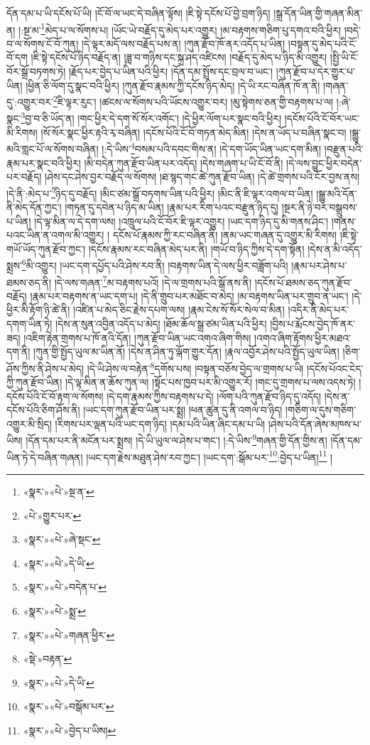 དོན་དམ་པ་ཡི་དངོས་པོ་ཡི། །ངོ་བོ་ལ་ཡང་དེ་བཞིན་ལྟོས། །ཇི་སྟེ་དངོས་པོ་བྱེ་བྲག་ཉིད། །སྒྲ་དོན་ཡིན་གྱི་གཞན་མིན་ན། །:སྔ་མ་\footnote{«སྣར་»«པེ་»སྔ་ན་}མེད་པ་ལ་སོགས་པ། །ཡོང་ཡེ་བརྗོད་དུ་མེད་པར་འགྱུར། །མ་བརྟགས་གཅིག་པུ་དགའ་བའི་ཕྱིར། །བདེ་བ་ལ་སོགས་ངོ་བོ་ཀུན། །དེ་ལྟར་མདོ་ལས་བརྗོད་པས་ན། །ཀུན་རྫོབ་ཁོ་ནར་འདོད་པ་ཡིན། །བསྟན་དུ་མེད་པའི་ངོ་བོ་དག །ཇི་སྟེ་དངོས་པོ་ཉིད་བརྗོད་ན། །ཟླ་བ་གཉིས་དང་སྐྲ་ཤད་འཛིངས། །བརྗོད་དུ་མེད་པ་ཉིད་མི་འགྱུར། །སྤྱི་ཡི་ངོ་བོར་སྒྲོ་བཏགས་ཏེ། །རྗོད་པར་བྱེད་པ་ཡིན་པའི་ཕྱིར། །དོན་དམ་སྤྲོས་དང་བྲལ་བ་ཡང་། །ཀུན་རྫོབ་པ་དེར་གྱུར་པ་ཡིན། །ཕྱིན་ཅི་ལོག་དུ་སྣང་བའི་ཕྱིར། །ཀུན་རྫོབ་རྣམས་ཀྱི་དངོས་ཉིད་མེད། །དེ་ཡི་རང་བཞིན་ཁོ་ན་ནི། །གཞན་དུ་:འགྱུར་བར་\footnote{«པེ་»གྱུར་པར་}ཇི་ལྟར་རུང་། །ཚངས་ལ་སོགས་པའི་ཡོངས་འགྱུར་བར། །མུ་སྟེགས་ཅན་གྱི་བརྟགས་པ་ལ། །:ཞེ་སྣང་\footnote{«སྣར་»«པེ་»ཞེ་སྡང་}བྱ་བ་ཅི་ཡོད་ན། །གང་ཕྱིར་དེ་དག་སོ་སོར་འགོང་། །དེ་ཕྱིར་ལོག་པར་སྣང་བའི་ཕྱིར། །དངོས་པོའི་ངོ་བོར་ཡང་མི་རིགས། །སོ་སོར་སྣང་ཕྱིར་རྟའི་རྭ་བཞིན། །དངོས་པོའི་ངོ་བོ་གཏན་མེད་མིན། །དེས་ན་ཡོད་པ་བཞིན་སྣང་བ། །སྒྱུ་མའི་གླང་པོ་ལ་སོགས་བཞིན། །:དེ་ཡིས་\footnote{«སྣར་»«པེ་»དེ་ཡི་}བསམ་པའི་དབང་གིས་ན། །དེ་དག་ཡོད་ཡིན་ཡང་དག་མིན། །བརྫུན་པའི་རྣམ་པར་སྣང་བའི་ཕྱིར། །མི་བདེན་ཀུན་རྫོབ་ཡིན་པར་འདོད། །དེས་གཞག་པ་ཡི་ངོ་བོ་ནི། །དེ་ལས་བྱུང་ཕྱིར་བདེན་པར་བརྗོད། །ཤེས་དང་ཤེས་བྱར་བརྗོད་ལ་སོགས། །ཐ་སྙད་གང་ཚེ་ཀུན་རྫོབ་ཡིན། །དེ་ཚེ་གྲགས་པའི་ངོར་བྱས་ནས། །དེ་ནི་:མེད་པ་\footnote{«སྣར་»«པེ་»བདེན་པ་}ཉིད་དུ་བརྗོད། །མིང་ཙམ་སྒྲོ་བཏགས་ཡིན་པའི་ཕྱིར། །མིང་ནི་ཇི་ལྟར་འགལ་བ་ཡིན། །སྒྱུ་མའི་དོན་ནི་མེད་དོན་ཀྱང་། །གཏན་དུ་དབེན་པ་ཉིད་མ་ཡིན། །རྣམ་པར་རིག་པའང་བརྫུན་ཉིད་དུ། །སྔར་ནི་ཉེ་བར་བསྒྲུབས་པ་ཡིན། །དེ་ལྟ་མིན་ལ་དེ་དག་ལས། །འཁྲུལ་པའི་ངོ་བོར་ཇི་ལྟར་འགྱུར། །ཡང་དག་ཉིད་དུ་མི་གནས་ཤིང་། །གནས་པའང་ཡིན་ན་འགལ་མི་འགྱུར། །
དངོས་པོ་རྣམས་ཀྱི་རང་བཞིན་ནི། །ནམ་ཡང་གཞན་དུ་འགྱུར་མི་རིགས། །ཇི་སྟེ་གཡོ་ཡོད་ཀུན་རྫོབ་ཀྱང་། །དངོས་རྣམས་རང་བཞིན་མེད་པར་ནི། །གཡོ་བ་ཉིད་ཀྱིས་དེ་དག་སྟོན། །དེས་ན་མི་འདོད་སྨྲས་\footnote{«སྣར་»«པེ་»སྨྲ་}མི་འགྱུར། །ཡང་དག་དཔྱོད་པའི་ཤེས་རབ་ནི། །བརྟགས་ཡིན་དེ་ལས་ཕྱིར་བཟློག་པའི། །རྣམ་པར་ཤེས་པ་ཐམས་ཅད་ནི། །དེ་ལས་གཞན་\footnote{«སྣར་»«པེ་»གཞན་ཕྱིར་}མ་བརྟགས་པའོ། །དེ་ལ་གྲགས་པའི་སྒོ་ནས་ནི། །དངོས་པོ་ཐམས་ཅད་ཀུན་རྫོབ་བརྗོད། །རྣམ་པར་བརྟགས་ན་ཡང་དག་པ། །དེ་ནི་གྲུབ་པར་མཐོང་བ་མེད། །མ་བརྟགས་ཡིན་པར་གྲུབ་ན་ཡང་། །དེ་ཕྱིར་མི་རྟོག་ཉི་ཚེ་ནི། །འཛིན་པ་མེད་ཅིང་རྗེས་དཔག་ལས། །རྣམ་ངེས་སོ་སོར་སེལ་བ་མིན། །འདིར་ནི་མེད་པར་དགག་ཡིན་ཏེ། །དེས་ན་སུན་འབྱིན་འདོད་པ་མེད། །ཐོམ་ཆོལ་སྒྲ་ཙམ་ཡིན་པའི་ཕྱིར། །བྱིས་པ་རྨོངས་བྱེད་ཁོ་ནར་ཟད། །འཇིག་རྟེན་གྲགས་པ་ཁོ་ནའི་དོན། །ཀུན་རྫོབ་ཡིན་ཡང་འགའ་ཞིག་གིས། །འགའ་ཞིག་རྟོགས་ཕྱིར་མཐའ་དག་ནི། །ཀུན་གྱི་སྤྱོད་ཡུལ་མ་ཡིན་ནོ། །དེས་ན་ཤིན་ཏུ་ལྐོག་གྱུར་དོན། །རྣལ་འབྱོར་ཤེས་པའི་སྤྱོད་ཡུལ་ཡིན། །ཅིག་ཤོས་ཀྱིས་ནི་ཤེས་པ་མེད། །དེ་ཡི་ཤེས་ལ་བརྟེན་\footnote{«སྡེ་»བརྟན་}དགོས་པས། །བསྟན་བཅོས་བྱེད་ལ་གྲགས་པ་ཡི། །དངོས་པོའང་ངེད་ཀྱི་ཀུན་རྫོབ་ཡིན། །དེ་ལྟ་མིན་ན་ཆོས་ཀུན་ལ། །སྟོང་པས་ཁྱབ་པར་མི་འགྱུར་རོ། །གང་དུ་གྲགས་པ་ལས་འདས་ཏེ། །དངོས་པོའི་ངོ་བོ་རྟག་ལ་སོགས། །དེ་དག་རྣམས་ཀྱིས་བརྟགས་པ་དེ། །ལོག་པའི་ཀུན་རྫོབ་ཉིད་དུ་འདོད། །དེས་ན་དངོས་པོའི་ཅིག་ཤོས་ནི། །ཡང་དག་ཀུན་རྫོབ་ཡིན་པར་སྨྲ། །ཕན་ཚུན་དུ་ནི་འགལ་བ་ཉིད། །གཅིག་ལ་དུས་གཅིག་འགྱུར་མི་སྲིད། །རིགས་པར་ལྡན་པའི་ཡང་དག་ཉིད། །དམ་པའི་ཡིན་ཞིང་དམ་པ་ཡི། །ཤེས་པའི་དོན་ཞེས་མཁས་པ་ཡིས། །དོན་དམ་པར་ནི་མངོན་པར་སྨྲས། །དེ་ཡི་ཡུལ་ལ་ཤེས་པ་གང་། །:དེ་ཡིས་\footnote{«སྣར་»«པེ་»དེ་ཡི་}གཞན་གྱི་དོན་གྱིས་ན། །དོན་དམ་ཡིན་ཏེ་དེ་བཞིན་གཞན། །ཡང་དག་རྗེས་མཐུན་ཤེས་རབ་ཀྱང་། །ཡང་དག་:སྒོམ་པར་\footnote{«སྣར་»«པེ་»བསྒོམ་པར་}:བྱེད་པ་ཡིན།\footnote{«སྣར་»«པེ་»བྱེད་པ་ཡིས།} །
